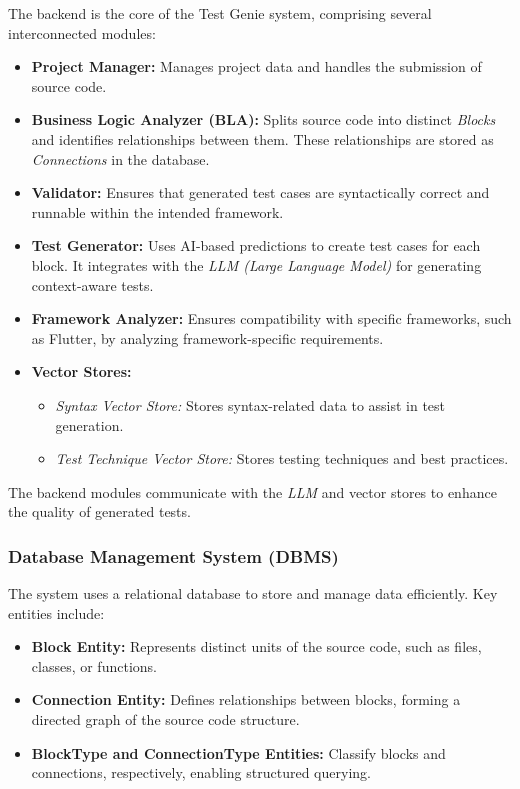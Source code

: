 \hspace{0.5cm}The backend is the core of the Test Genie system, comprising several interconnected modules:
\begin{itemize}
    \item \textbf{Project Manager:} Manages project data and handles the submission of source code.
    \item \textbf{Business Logic Analyzer (BLA):} Splits source code into distinct \textit{Blocks} and identifies relationships between them. These relationships are stored as \textit{Connections} in the database.
    \item \textbf{Validator:} Ensures that generated test cases are syntactically correct and runnable within the intended framework.
    \item \textbf{Test Generator:} Uses AI-based predictions to create test cases for each block. It integrates with the \textit{LLM (Large Language Model)} for generating context-aware tests.
    \item \textbf{Framework Analyzer:} Ensures compatibility with specific frameworks, such as Flutter, by analyzing framework-specific requirements.
    \item \textbf{Vector Stores:}
        \begin{itemize}
            \item \textit{Syntax Vector Store:} Stores syntax-related data to assist in test generation.
            \item \textit{Test Technique Vector Store:} Stores testing techniques and best practices.
        \end{itemize}
\end{itemize}

\hspace{0.5cm}The backend modules communicate with the \textit{LLM} and vector stores to enhance the quality of generated tests.

\subsubsection{Database Management System (DBMS)}

\hspace{0.5cm}The system uses a relational database to store and manage data efficiently. Key entities include:
\begin{itemize}
    \item \textbf{Block Entity:} Represents distinct units of the source code, such as files, classes, or functions.
    \item \textbf{Connection Entity:} Defines relationships between blocks, forming a directed graph of the source code structure.
    \item \textbf{BlockType and ConnectionType Entities:} Classify blocks and connections, respectively, enabling structured querying.
\end{itemize}

